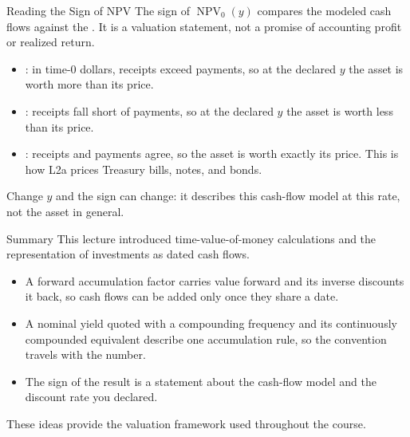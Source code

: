 \documentclass[aspectratio=169,11pt]{beamer}
\begin{document}
\begin{frame}{Reading the Sign of NPV}
  \vspace{0.2em}
  The sign of $\operatorname{NPV}_0(y)$ compares the modeled cash flows against
  the . It is a valuation statement, not a promise of
  accounting profit or realized return.

  \vspace{0.6em}
  \begin{itemize}\setlength{\itemsep}{0.45em}
    \item \textbf{}: in time-0 dollars, receipts exceed payments,
      so at the declared $y$ the asset is worth more than its price.
    \item \textbf{}: receipts fall short of payments, so at the
      declared $y$ the asset is worth less than its price.
    \item \textbf{}: receipts and payments agree, so the asset is worth
      exactly its price. This is how L2a prices Treasury bills, notes, and bonds.
  \end{itemize}

  \vspace{0.6em}
  Change $y$ and the sign can change: it describes this cash-flow model at this
  rate, not the asset in general.

\end{frame}

\begin{frame}{Summary}
  This lecture introduced time-value-of-money calculations and the
  representation of investments as dated cash flows.

  \vspace{0.6em}
  \vspace{0.25em}
  \begin{itemize}\setlength{\itemsep}{0.45em}
    \item \textbf{}
      A forward accumulation factor carries value forward and its inverse
      discounts it back, so cash flows can be added only once they share a date.
    \item \textbf{} A nominal yield quoted
      with a compounding frequency and its continuously compounded equivalent
      describe one accumulation rule, so the convention travels with the number.
    \item \textbf{} The sign
      of the result is a statement about the cash-flow model and the discount
      rate you declared.
  \end{itemize}

  \vspace{0.6em}
  These ideas provide the valuation framework used throughout the course.
\end{frame}
\end{document}

